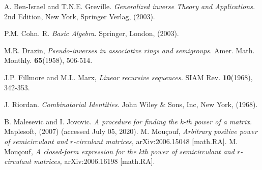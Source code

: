\documentclass[12pt]{amsart}
\theoremstyle{definition}
\numberwithin{equation}{section}
\numberwithin{equation}{section}
\begin{document}
\begin{thebibliography}{99}
 A. Ben-Israel and T.N.E. Greville. \emph{Generalized inverse Theory and Applications.} 2nd Edition, New York, Springer Verlag, (2003).

 P.M. Cohn. R. \emph{Basic Algebra.} Springer, London, (2003).

  M.R. Drazin, \emph{Pseudo-inverses in associative rings and semigroups.}
Amer. Math. Monthly. {\bf 65}(1958), 506-514.

 J.P. Fillmore and M.L. Marx, \emph{Linear recursive sequences.} SIAM Rev. {\bf 10}(1968), 342-353.

 J. Riordan. \emph{Combinatorial Identities.} John Wiley $\&$ Sons, Inc, New York, (1968).

 B. Malesevic and I. Jovovic. \emph{A procedure for finding the k-th power of a matrix.} Maplesoft, (2007) (accessed July 05, 2020).
 M. Mou\c{c}ouf, \emph{Arbitrary positive power of semicirculant and $r$-circulant matrices,} 	arXiv:2006.15048 [math.RA].
 M. Mou\c{c}ouf, \emph{A closed-form expression for the kth power of semicirculant and $r$-circulant matrices,} 	 arXiv:2006.16198 [math.RA].
\end{thebibliography}
\end{document}
